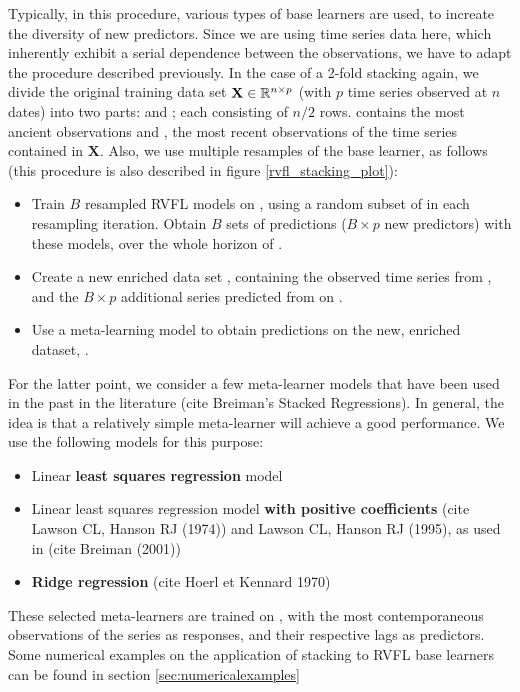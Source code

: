 Typically, in this procedure, various types of base learners are used, to increate the diversity of new predictors. Since we are using time series data here, which inherently exhibit a serial dependence between the observations, we have to adapt the procedure described previously. In the case of a 2-fold stacking again, we divide the original training data set  $\textbf{X} \in \mathbb{R}^{n \times p}$ (with $p$ time series observed at $n$ dates) into two parts:  and ; each consisting of $n/2$ rows.  contains the most ancient observations and , the most recent observations of the time series contained in $\textbf{X}$. Also, we use multiple resamples of the base learner, as follows (this procedure is also described in figure \ref{rvfl_stacking_plot}):

\begin{itemize}
\item Train $B$ resampled RVFL models on , using a random subset of  in each resampling iteration. Obtain $B$ sets of predictions ($B \times p$ new predictors) with these models, over the whole horizon  of .
\item Create a new enriched data set , containing the observed time series from , and the $B \times p$ additional series predicted from  on .
\item Use a meta-learning model to obtain predictions on the new, enriched dataset, .
\end{itemize}

For the latter point, we consider a few meta-learner models that have been used in the past in the literature (cite Breiman's Stacked Regressions). In general, the idea is that a relatively simple meta-learner will achieve a good performance. We use the following models for this purpose:
\begin{itemize}
\item Linear \textbf{least squares regression} model
\item Linear least squares regression model \textbf{with positive coefficients} (cite Lawson CL, Hanson RJ (1974)) and Lawson CL, Hanson RJ (1995), as used in (cite Breiman (2001))
\item \textbf{Ridge regression} (cite Hoerl et Kennard 1970)
\end{itemize}

These selected meta-learners are trained on , with the most contemporaneous observations of the series as responses, and their respective lags as predictors. Some numerical examples on the application of stacking to RVFL base learners can be found in section \ref{sec:numericalexamples}


